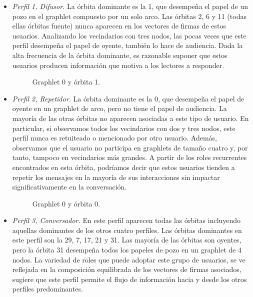 \begin{itemize} 

\item \emph{Perfil 1, Difusor.} La órbita dominante es la 1, que desempeña el papel de un pozo en el graphlet compuesto por un solo arco. Las órbitas 2, 6 y 11 (todas ellas órbitas fuente) nunca aparecen en los vectores de firmas de estos usuarios. Analizando los vecindarios con tres nodos, las pocas veces que este perfil desempeña el papel de oyente, también lo hace de audiencia. Dada la alta frecuencia de la órbita dominante, es razonable suponer que estos usuarios producen información que motiva a los lectores a responder. 
\begin{figure}[htbp]
   \centering
   
    \caption{Graphlet 0 y órbita 1.}
    \label{img:web-comp}
\end{figure}

\item \emph{Perfil 2, Repetidor.} La órbita dominante es la 0, que desempeña el papel de oyente en un graphlet de arco, pero no tiene el papel de audiencia. La mayoría de las otras órbitas no aparecen asociadas a este tipo de usuario. En particular, si observamos todos los vecindarios con dos y tres nodos, este perfil nunca es retuiteado o mencionado por otro usuario. Además, observamos que el usuario no participa en graphlets de tamaño cuatro y, por tanto, tampoco en vecindarios más grandes. A partir de los roles recurrentes encontrados en esta órbita, podríamos decir que estos usuarios tienden a repetir los mensajes en la mayoría de sus interacciones sin impactar significativamente en la conversación. \begin{figure}[htbp]
   \centering
   
    \caption{Graphlet 0 y órbita 0.}
    \label{img:web-comp}
\end{figure}

\item \emph{Perfil 3, Conversador.} En este perfil aparecen todas las órbitas incluyendo aquellas dominantes de los otros cuatro perfiles. Las órbitas dominantes en este perfil son la 29, 7, 17, 21 y 31. Las mayoría de las órbitas son oyentes, pero la órbita 31 desempeña todos los papeles de pozo en un graphlet de 4 nodos. La variedad de roles que puede adoptar este grupo de usuarios, se ve reflejada en la composición equilibrada de los vectores de firmas asociados, sugiere que este perfil permite el flujo de información hacia y desde los otros perfiles predominantes.
    

\end{itemize}
